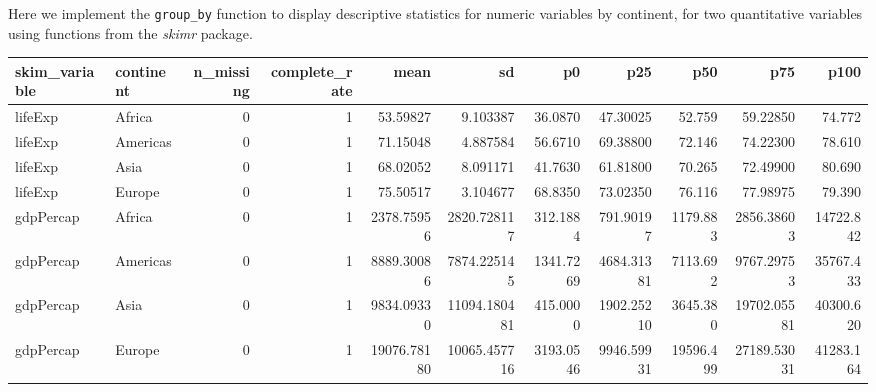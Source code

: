 \documentclass[]{book}
\newenvironment{Shaded}{\begin{snugshade}}{\end{snugshade}}
\newcommand{\KeywordTok}[1]{\textcolor[rgb]{0.13,0.29,0.53}{\textbf{#1}}}
\newcommand{\DecValTok}[1]{\textcolor[rgb]{0.00,0.00,0.81}{#1}}
\newcommand{\StringTok}[1]{\textcolor[rgb]{0.31,0.60,0.02}{#1}}
\newcommand{\OperatorTok}[1]{\textcolor[rgb]{0.81,0.36,0.00}{\textbf{#1}}}
\newcommand{\NormalTok}[1]{#1}
\begin{document}
Here we implement the \texttt{group\_by} function to display descriptive
statistics for numeric variables by continent, for two quantitative
variables using functions from the \emph{skimr} package.

\begin{Shaded}
\end{Shaded}

\begin{tabular}{l|l|r|r|r|r|r|r|r|r|r}
\hline
skim\_variable & continent & n\_missing & complete\_rate & mean & sd & p0 & p25 & p50 & p75 & p100\\
\hline
lifeExp & Africa & 0 & 1 & 53.59827 & 9.103387 & 36.0870 & 47.30025 & 52.759 & 59.22850 & 74.772\\
\hline
lifeExp & Americas & 0 & 1 & 71.15048 & 4.887584 & 56.6710 & 69.38800 & 72.146 & 74.22300 & 78.610\\
\hline
lifeExp & Asia & 0 & 1 & 68.02052 & 8.091171 & 41.7630 & 61.81800 & 70.265 & 72.49900 & 80.690\\
\hline
lifeExp & Europe & 0 & 1 & 75.50517 & 3.104677 & 68.8350 & 73.02350 & 76.116 & 77.98975 & 79.390\\
\hline
gdpPercap & Africa & 0 & 1 & 2378.75956 & 2820.728117 & 312.1884 & 791.90197 & 1179.883 & 2856.38603 & 14722.842\\
\hline
gdpPercap & Americas & 0 & 1 & 8889.30086 & 7874.225145 & 1341.7269 & 4684.31381 & 7113.692 & 9767.29753 & 35767.433\\
\hline
gdpPercap & Asia & 0 & 1 & 9834.09330 & 11094.180481 & 415.0000 & 1902.25210 & 3645.380 & 19702.05581 & 40300.620\\
\hline
gdpPercap & Europe & 0 & 1 & 19076.78180 & 10065.457716 & 3193.0546 & 9946.59931 & 19596.499 & 27189.53031 & 41283.164\\
\hline
\end{tabular}
\end{document}
